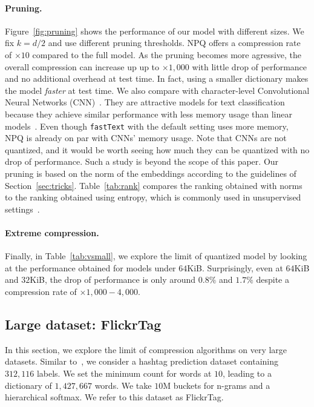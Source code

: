 \paragraph{Pruning.}
Figure~\ref{fig:pruning} shows the performance of our model with different sizes. We fix $k=d/2$ and use different pruning thresholds. NPQ offers a compression rate of $\times 10$ compared to the full model.  As the pruning becomes more agressive, the overall compression can increase up up to $\times 1,000$ with little drop of performance and no additional overhead at test time. In fact, using a smaller dictionary makes the model \emph{faster} at test time.  We also compare with character-level Convolutional Neural Networks (CNN)~\citep{Z15,xiao2016efficient}.  They are attractive models for text classification because they achieve similar performance with less memory usage than linear models~\citep{xiao2016efficient}.  Even though \texttt{fastText} with the default setting uses more memory, NPQ is already on par with CNNs' memory usage.  Note that CNNs are not quantized, and it would be worth seeing how much they can be quantized with no drop of performance. Such a study is beyond the scope of this paper. Our pruning is based on the norm of the embeddings according to the guidelines of Section~\ref{sec:tricks}.
Table~\ref{tab:rank} compares the ranking obtained with norms to the ranking obtained using entropy, which is commonly used in unsupervised settings~\cite{stolcke2000entropy}. 

\paragraph{Extreme compression.} Finally, in Table~\ref{tab:vsmall}, we explore the limit of quantized model by looking at the performance obtained for models under $64$KiB. Surprisingly, even at $64$KiB and $32$KiB, the drop of performance is only around
$0.8\%$ and $1.7\%$ despite a compression rate of $\times 1,000-4,000$. 

\subsection{Large dataset: FlickrTag}

In this section, we explore the limit of compression algorithms on very large datasets.  Similar to~\citet{J16}, we consider a hashtag prediction dataset containing $312,116$ labels.  We set the minimum count for words at $10$, leading to a dictionary of $1,427,667$ words. We take $10$M buckets for n-grams and a hierarchical softmax. We refer to this dataset as FlickrTag. 

